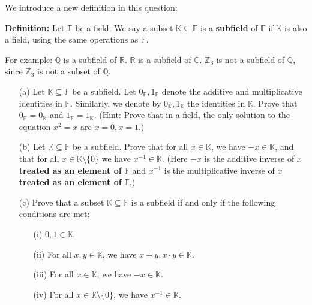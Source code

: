 \documentclass{article}
\theoremstyle{plain} %
\numberwithin{thm}{section} %
\theoremstyle{definition}
\begin{document}
    \newpage
    \begin{question}{4}
        We introduce a new definition in this question:

        \textbf{Definition:} Let \( \mathbb{F} \) be a field. We say a subset \( \mathbb{K} \subseteq \mathbb{F} \) is a \textbf{subfield} of \( \mathbb{F} \) if \( \mathbb{K} \) is also a field, using the same operations as \( \mathbb{F} \).

        For example: \( \mathbb{Q} \) is a subfield of \( \mathbb{R} \). \( \mathbb{R} \) is a subfield of \( \mathbb{C} \). \( \mathbb{Z}_3 \) is not a subfield of \( \mathbb{Q} \), since \( \mathbb{Z}_3 \) is not a subset of \( \mathbb{Q} \).

        \begin{enumerate}
            \item[(a)] Let \( \mathbb{K} \subseteq \mathbb{F} \) be a subfield. Let \( 0_{\mathbb{F}}, 1_{\mathbb{F}} \) denote the additive and multiplicative identities in \( \mathbb{F} \). Similarly, we denote by \( 0_{\mathbb{K}}, 1_{\mathbb{K}} \) the identities in \( \mathbb{K} \). Prove that \( 0_{\mathbb{F}} = 0_{\mathbb{K}} \) and \( 1_{\mathbb{F}} = 1_{\mathbb{K}} \). 
            (Hint: Prove that in a field, the only solution to the equation \( x^2 = x \) are \( x = 0, x = 1 \).)
            
            \item[(b)] Let \( \mathbb{K} \subseteq \mathbb{F} \) be a subfield. Prove that for all \( x \in \mathbb{K} \), we have \( -x \in \mathbb{K} \), and that for all \( x \in \mathbb{K} \setminus \{0\} \) we have \( x^{-1} \in \mathbb{K} \). (Here \( -x \) is the additive inverse of \( x \) \textbf{treated as an element of} \( \mathbb{F} \) and \( x^{-1} \) is the multiplicative inverse of \( x \) \textbf{treated as an element of} \( \mathbb{F} \).)
            
            \item[(c)] Prove that a subset \( \mathbb{K} \subseteq \mathbb{F} \) is a subfield if and only if the following conditions are met:
            
            \begin{enumerate}
                \item[(i)] \( 0,1 \in \mathbb{K} \).
                \item[(ii)] For all \( x, y \in \mathbb{K} \), we have \( x + y, x \cdot y \in \mathbb{K} \).
                \item[(iii)] For all \( x \in \mathbb{K} \), we have \( -x \in \mathbb{K} \).
                \item[(iv)] For all \( x \in \mathbb{K} \setminus \{ 0 \} \), we have \( x^{-1} \in \mathbb{K} \).
            \end{enumerate}
            

\end{enumerate}
\end{question}
\end{document}
